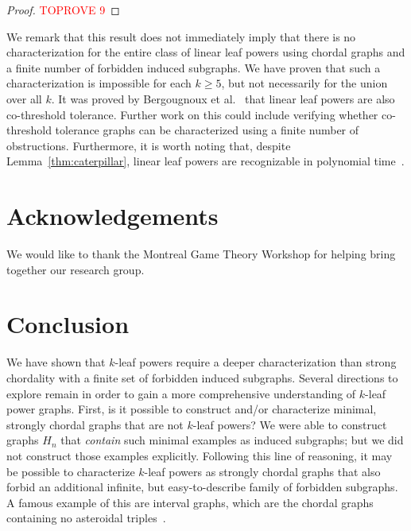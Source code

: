 \documentclass[11pt,letter]{article}
\theoremstyle{remark}
\begin{document}
\begin{proof}\textcolor{red}{TOPROVE 9}\end{proof}
We remark that this result does not immediately imply that there is no characterization for the entire class of linear leaf powers using chordal graphs and a finite number of forbidden induced subgraphs.
We have proven that such a characterization is impossible for each $k\geq 5$, but not necessarily for the union over all $k$. It was proved by Bergougnoux et al.~\cite{Bergougnoux} that linear leaf powers are also co-threshold tolerance. Further work on this could include verifying whether co-threshold tolerance graphs can be characterized using a finite number of obstructions.
Furthermore, it is worth noting that, despite Lemma~\ref{thm:caterpillar}, linear leaf powers are recognizable in polynomial time~\cite{Bergougnoux}. 

\section{Acknowledgements}

We would like to thank the Montreal Game Theory Workshop for helping bring together our research group.


\section{Conclusion}
We have shown that $k$-leaf powers require a deeper characterization than strong chordality with a finite set of forbidden induced subgraphs. Several directions  to explore remain in order to gain a more comprehensive understanding of $k$-leaf power graphs.
First, is it possible to construct and/or characterize minimal, strongly chordal graphs that are not $k$-leaf powers?  We were able to construct graphs $H_n$ that \emph{contain} such minimal examples as induced subgraphs; but we did not construct those examples explicitly.
Following this line of reasoning, it may be possible to characterize $k$-leaf powers as strongly chordal graphs that also forbid an additional infinite, but easy-to-describe family of forbidden subgraphs. A famous example of this are interval graphs, which are the chordal graphs containing no asteroidal triples~\cite{LB62}.
\end{document}
